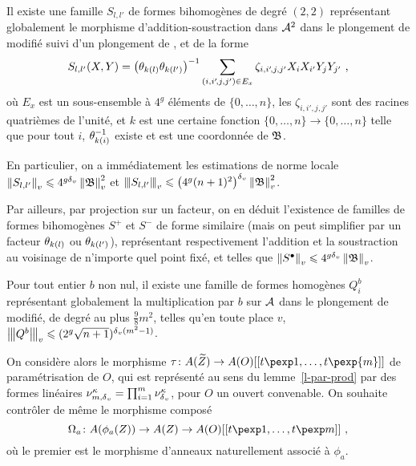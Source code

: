 \documentclass{mpg-preth}
\begin{document}
\begin{fact}
  Il existe une famille $S_{l, l'}$ de formes bihomogènes de degré $(2, 2)$
  représentant globalement le morphisme d'addition-soustraction dans $\mathcal{A}^2$ dans
  le plongement de  modifié suivi d'un plongement de ,
  et de la forme
  \[
    S_{l, l'}(X, Y) = \big(\theta_{k(l)}\theta_{k(l')}\big)^{-1}
    \sum_{(i, i'\!,j, j') \in E_x}
    \zeta_{i, i'\!, j, j'} X_i X_{i'} Y_j Y_{j'} \text{ ,}
  \]
  où $E_x$ est un sous-ensemble à $4^g$ éléments de $\{0, \ldots, n \}$, les
  $\zeta_{i, i'\!, j, j'}$ sont des racines quatrièmes de l'unité, et $k$ est
  une certaine fonction $\{0, \ldots, n \} \to \{0, \ldots, n \}$ telle que pour
  tout $i$, $\theta_{k(i)}^{-1}$ existe et est une coordonnée de $\mathfrak{B}$.
\end{fact}

En particulier, on a immédiatement les estimations de norme locale
$\left\lVert\smash{S_{l, l'}}\right\rVert_{v} \leqslant 4^{g{\delta\smash{_v}}} \left\lVert\mathfrak{B}\right\rVert_{v}^2$ et $\left\lvert\hspace{-1pt}\left\lvert\hspace{-1pt} \left\lvert\smash{S_{l, l'}}\right\rvert \hspace{-1pt}\right\rvert\hspace{-1pt}\right\rvert_{v} \leqslant
\big(4^g (n+1)^2\big)^{\delta\smash{_v}} \left\lVert\mathfrak{B}\right\rVert_{v}^2$.

Par ailleurs, par projection sur un facteur, on en déduit l'existence de
familles de formes bihomogènes $S^+$ et $S^-$ de forme similaire (mais on peut
simplifier par un facteur $\theta_{k(l)}$ ou $\theta_{k(l')}$), représentant
respectivement l'addition et la soustraction au voisinage de n'importe quel
point fixé, et telles que $\left\lVert S^\bullet\right\rVert_{v} \leqslant 4^{g{\delta\smash{_v}}} \left\lVert\mathfrak{B}\right\rVert_{v}$.

\begin{fact}
  Pour tout entier $b$ non nul, il existe une famille de formes homogènes
  $Q^b_i$ représentant globalement la multiplication par $b$ sur $\mathcal{A}$ dans le
  plongement de  modifié, de degré au plus $\frac98 m^2$, telles
  qu'en toute place $v$, $\left\lvert\hspace{-1pt}\left\lvert\hspace{-1pt} \left\lvert Q^b\right\rvert \hspace{-1pt}\right\rvert\hspace{-1pt}\right\rvert_{v} \leqslant (2^g\sqrt{n+1})^{{\delta\smash{_v}}(m^2-1)}$.
\end{fact}

On considère alors le morphisme $\tau \colon A(\widetilde Z) \to
A(O)[[t\pexp1, \ldots, t\pexp{m}]]$ de paramétrisation de $O$, qui est \og
représenté \fg{} au sens du lemme~\ref{l-par-prod} par des formes linéaires
$\nu_{m, {\delta\smash{_v}}}^\kappa = \prod_{i=1}^m \nu_{\delta\smash{_v}}^\kappa$, pour $O$ un ouvert
convenable. On souhaite contrôler de même le morphisme composé
\[
  \Omega_a \colon A(\phi_a(Z)) \to A(Z) \to A(O)[[t\pexp1,
  \ldots, t\pexp m]] \pmm,
\]
où le premier est le morphisme d'anneaux naturellement associé à $\phi_a$.
\end{document}
